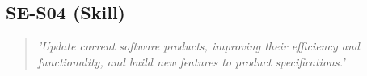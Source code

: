 \subsection{SE-S04 (Skill)}

  \begin{quote}
    \textit{'Update current software products, improving
    their efficiency and functionality, and build new features
    to product specifications.'}
  \end{quote}

\newpage